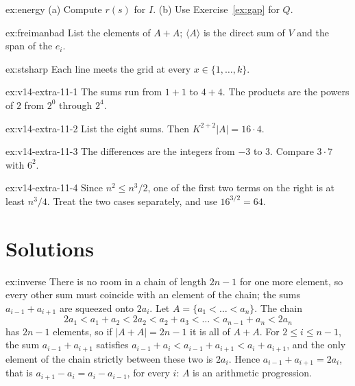 \begin{hint}{ex:energy}
(a) Compute $r(s)$ for $I$. (b) Use Exercise~\ref{ex:gap} for $Q$.
\end{hint}

\begin{hint}{ex:freimanbad}
List the elements of $A+A$; $\langle A\rangle$ is the direct sum of $V$ and the span of the $e_i$.
\end{hint}

\begin{hint}{ex:stsharp}
Each line meets the grid at every $x\in\{1,\dots,k\}$.
\end{hint}

\begin{hint}{ex:v14-extra-11-1}
The sums run from $1+1$ to $4+4$. The products are the powers of $2$ from $2^0$ through $2^4$.
\end{hint}

\begin{hint}{ex:v14-extra-11-2}
List the eight sums. Then $K^{2+2}|A|=16\cdot4$.
\end{hint}

\begin{hint}{ex:v14-extra-11-3}
The differences are the integers from $-3$ to $3$. Compare $3\cdot7$ with $6^2$.
\end{hint}

\begin{hint}{ex:v14-extra-11-4}
Since $n^2\le n^3/2$, one of the first two terms on the right is at least $n^3/4$. Treat the two cases separately, and use $16^{3/2}=64$.
\end{hint}

\section{Solutions}

\begin{solution}{ex:inverse}
\idea There is no room in a chain of length $2n-1$ for one more element, so every other sum must coincide with an element of the chain; the sums $a_{i-1}+a_{i+1}$ are squeezed onto $2a_i$.
\writeup Let $A=\{a_1<\dots<a_n\}$. The chain
\[
2a_1<a_1+a_2<2a_2<a_2+a_3<\dots<a_{n-1}+a_n<2a_n
\]
has $2n-1$ elements, so if $|A+A|=2n-1$ it is all of $A+A$. For $2\le i\le n-1$, the sum $a_{i-1}+a_{i+1}$ satisfies $a_{i-1}+a_i<a_{i-1}+a_{i+1}<a_i+a_{i+1}$, and the only element of the chain strictly between these two is $2a_i$. Hence $a_{i-1}+a_{i+1}=2a_i$, that is $a_{i+1}-a_i=a_i-a_{i-1}$, for every $i$: $A$ is an arithmetic progression.
\end{solution}

